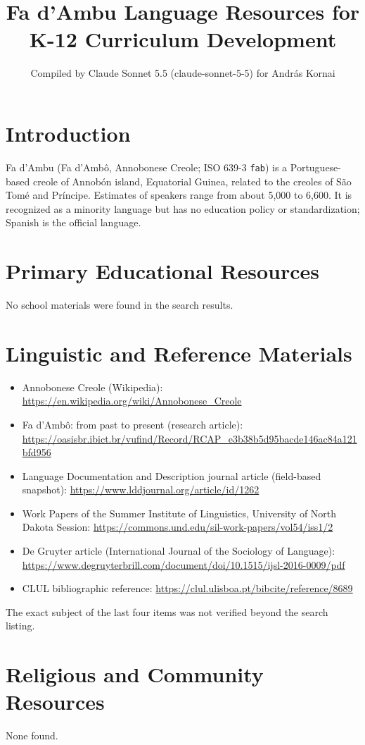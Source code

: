 \documentclass[12pt]{article}
\title{Fa d'Ambu Language Resources for K-12 Curriculum Development}
\author{Compiled by Claude Sonnet 5.5 (claude-sonnet-5-5) for Andr\'as Kornai}
\date{}
\begin{document}
\maketitle

\section{Introduction}
Fa d'Ambu (Fa d'Amb\^o, Annobonese Creole; ISO 639-3 \texttt{fab}) is a Portuguese-based creole of Annob\'on island, Equatorial Guinea, related to the creoles of S\~ao Tom\'e and Pr\'incipe. Estimates of speakers range from about 5,000 to 6,600. It is recognized as a minority language but has no education policy or standardization; Spanish is the official language.

\section{Primary Educational Resources}
No school materials were found in the search results.

\section{Linguistic and Reference Materials}
\begin{itemize}
\item Annobonese Creole (Wikipedia): \url{https://en.wikipedia.org/wiki/Annobonese_Creole}
\item Fa d'Amb\^o: from past to present (research article): \url{https://oasisbr.ibict.br/vufind/Record/RCAP_e3b38b5d95bacde146ac84a121bfd956}
\item Language Documentation and Description journal article (field-based snapshot): \url{https://www.lddjournal.org/article/id/1262}
\item Work Papers of the Summer Institute of Linguistics, University of North Dakota Session: \url{https://commons.und.edu/sil-work-papers/vol54/iss1/2}
\item De Gruyter article (International Journal of the Sociology of Language): \url{https://www.degruyterbrill.com/document/doi/10.1515/ijsl-2016-0009/pdf}
\item CLUL bibliographic reference: \url{https://clul.ulisboa.pt/bibcite/reference/8689}
\end{itemize}
The exact subject of the last four items was not verified beyond the search listing.

\section{Religious and Community Resources}
None found.
\end{document}
